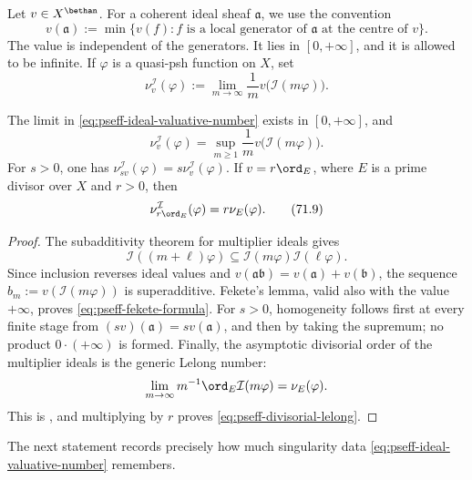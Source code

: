 Let $v\in X^{\bethan}$.  For a coherent ideal sheaf $\mathfrak a$,
we use the convention
\[
 v(\mathfrak a):=\min\{v(f):f\text{ is a local generator of }
 \mathfrak a\text{ at the centre of }v\}.
\tag{71.6}\label{eq:pseff-ideal-value}
\]
The value is independent of the generators.  It lies in
$[0,+\infty]$, and it is allowed to be infinite.  If $\varphi$ is a
quasi-psh function on $X$, set
\[
 \nu_v^{\mathcal I}(\varphi)
 :=\lim_{m\to\infty}\frac{1}{m}
      v\bigl(\mathcal I(m\varphi)\bigr).
\tag{71.7}\label{eq:pseff-ideal-valuative-number}
\]

\begin{proposition}\label{prop:pseff-ideal-valuative-basic}
The limit in \eqref{eq:pseff-ideal-valuative-number} exists in
$[0,+\infty]$, and
\[
 \nu_v^{\mathcal I}(\varphi)
 =\sup_{m\geq1}\frac{1}{m}
      v\bigl(\mathcal I(m\varphi)\bigr).
\tag{71.8}\label{eq:pseff-fekete-formula}
\]
For $s>0$, one has
$\nu_{sv}^{\mathcal I}(\varphi)=s\nu_v^{\mathcal I}(\varphi)$.  If
$v=r\ord_E$, where $E$ is a prime divisor over $X$ and
$r>0$, then
\[
             \nu_{r\ord_E}^{\mathcal I}(\varphi)
             =r\nu_E(\varphi).
\tag{71.9}\label{eq:pseff-divisorial-lelong}
\]
\end{proposition}

\begin{proof}
The subadditivity theorem for multiplier ideals gives
\[
 \mathcal I((m+\ell)\varphi)
 \subseteq\mathcal I(m\varphi)\mathcal I(\ell\varphi).
\tag{71.10}\label{eq:pseff-multiplier-subadditivity}
\]
Since inclusion reverses ideal values and $v(\mathfrak a\mathfrak b)
=v(\mathfrak a)+v(\mathfrak b)$, the sequence
$b_m:=v(\mathcal I(m\varphi))$ is superadditive.  Fekete's lemma,
valid also with the value $+\infty$, proves
\eqref{eq:pseff-fekete-formula}.  For $s>0$, homogeneity follows first at
every finite stage from $(sv)(\mathfrak a)=s v(\mathfrak a)$, and then by
taking the supremum; no product $0\cdot(+\infty)$ is formed.  Finally, the
asymptotic divisorial order of the
multiplier ideals is the generic Lelong number:
\[
 \lim_{m\to\infty}m^{-1}\ord_E\mathcal I(m\varphi)
 =\nu_E(\varphi).
\]
This is \cite[Lemma~B.4]{BBJ21}, and multiplying by $r$ proves
\eqref{eq:pseff-divisorial-lelong}.
\end{proof}

The next statement records precisely how much singularity data
\eqref{eq:pseff-ideal-valuative-number} remembers.

